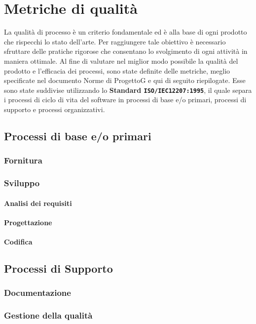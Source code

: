 \documentclass{article}
\begin{document}
\section{Metriche di qualità}
La qualità di processo è un criterio fondamentale ed è alla base di ogni prodotto che
rispecchi lo stato dell’arte. Per raggiungere tale obiettivo è necessario sfruttare delle
pratiche rigorose che consentano lo svolgimento di ogni attività in maniera ottimale.
Al fine di valutare nel miglior modo possibile la qualità del prodotto e l’efficacia dei
processi, sono state definite delle metriche, meglio specificate nel documento Norme
di ProgettoG e qui di seguito riepilogate. Esse sono state suddivise utilizzando lo \textbf{Standard \texttt{ISO/IEC12207:1995}}, il quale separa i processi di ciclo di vita del software in processi di
base e/o primari, processi di supporto e processi organizzativi.
\subsection{Processi di base e/o primari}
\subsubsection{Fornitura} %
\subsubsection{Sviluppo} %
\paragraph{Analisi dei requisiti}%
\paragraph{Progettazione}%
\paragraph{Codifica} %
\subsection{Processi di Supporto}
\subsubsection{Documentazione}%
\subsubsection{Gestione della qualità}%
\end{document}
